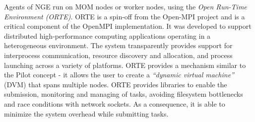 


Agents of NGE run on MOM nodes or worker nodes, using the \emph{Open Run-Time
Environment (ORTE)}. ORTE is a spin-off from the Open-MPI project and is a
critical component of the OpenMPI implementation. It was developed to support
distributed high-performance computing applications operating in a heterogeneous
environment. The system transparently provides support for interprocess
communication, resource discovery and allocation, and process launching across a
variety of platforms. ORTE provides a mechanism similar to the Pilot concept -
it allows the user to create a \emph{``dynamic virtual machine''} (DVM) that
spans multiple nodes. ORTE provides libraries to enable the submission,
monitoring and managing of tasks, avoiding filesystem bottlenecks and race
conditions with network sockets. As a consequence, it is able to minimize the
system overhead while submitting tasks.

%


